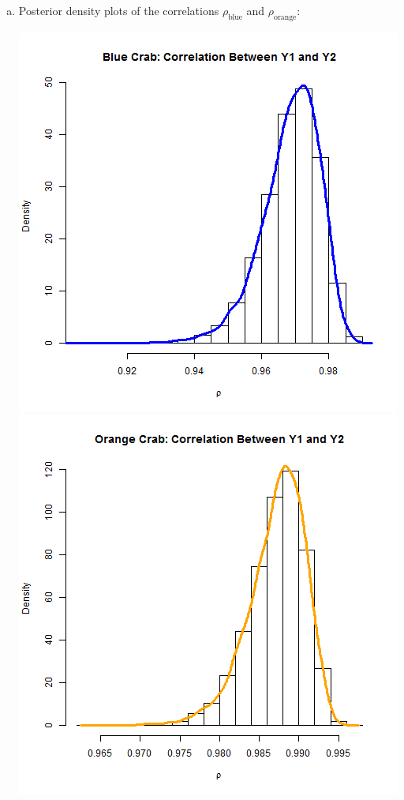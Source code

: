 \documentclass{article}
\begin{document}
\begin{enumerate}[7.1]
\begin{enumerate}[(a)]
		\item Posterior density plots of the correlations $\rho_{\text{blue}}$ and $\rho_{\text{orange}}$:
		
		\includegraphics[scale=0.4]{bluedist.png}
		\includegraphics[scale=0.4]{ordist.png}
		

\end{enumerate}
\end{enumerate}
\end{document}

